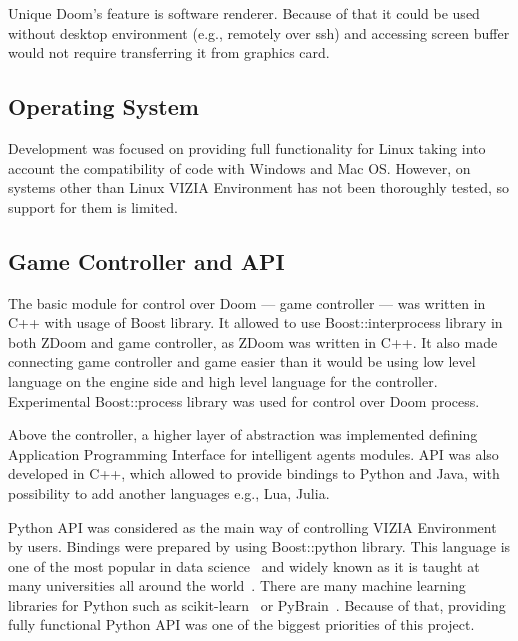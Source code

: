Unique Doom's feature is software renderer. Because of that it could be used without desktop environment (e.g., remotely over ssh) and accessing screen buffer would not require transferring it from graphics card.

\subsection{Operating System}

Development was focused on providing full functionality for Linux taking into account the compatibility of code with Windows and Mac OS.
However, on systems other than Linux VIZIA Environment has not been thoroughly tested, so support for them is limited.


\subsection{Game Controller and API}


The basic module for control over Doom --- game controller --- was written in C++ with usage of Boost library.
It allowed to use Boost::interprocess library in both ZDoom and game controller, as ZDoom was written in C++.
It also made connecting game controller and game easier than it would be using low level language on the engine side and high level language for the controller.
Experimental Boost::process library was used for control over Doom process.


Above the controller, a higher layer of abstraction was implemented defining Application Programming Interface for intelligent agents modules.
API was also developed in C++, which allowed to provide bindings to Python and Java, with possibility to add another languages e.g., Lua, Julia.


Python API was considered as the main way of controlling VIZIA Environment by users.
Bindings were prepared by using Boost::python library.
This language is one of the most popular in data science~\cite{ds_lang} and widely known as it is taught at many universities all around the world~\cite{pythons_schools}.
There are many machine learning libraries for Python such as scikit-learn~\cite{scikit} or PyBrain~\cite{pybrain}.
Because of that, providing fully functional Python API was one of the biggest priorities of this project.



